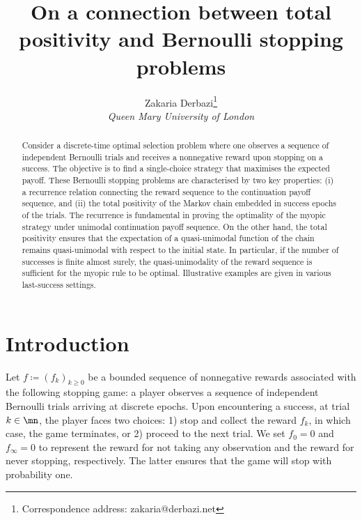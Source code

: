 \documentclass[11pt]{article}
\title{On a connection between total positivity and Bernoulli stopping problems}
\author{Zakaria Derbazi\footnote{Correspondence address: zakaria@derbazi.net} \\{\it\small Queen Mary University of London}}
\def\myabstract{
	Consider a discrete-time optimal selection problem where one observes a sequence of   independent Bernoulli trials and receives a nonnegative reward upon stopping on a success. The objective is to find a single-choice strategy that maximises the expected payoff. These Bernoulli stopping problems are characterised by two key properties: (i) a recurrence relation connecting the reward sequence to the continuation payoff sequence, and (ii) the total positivity of the Markov chain  embedded in success epochs of the trials. The recurrence is fundamental in proving the optimality of the myopic strategy under unimodal continuation payoff sequence. On the other hand, the total positivity ensures that the expectation of a quasi-unimodal function of the chain remains quasi-unimodal with respect to the initial state. In particular, if  the number of successes is finite almost surely, the quasi-unimodality of the  reward sequence is sufficient for the myopic rule to be optimal. Illustrative examples are given in various last-success settings.
}
\begin{document}
	\maketitle
	\begin{abstract}
		\myabstract
	\end{abstract}
	
	

	\section{Introduction}\label{sect1}
	Let  $f \coloneqq (f_k)_{k \ge 0}$ be a bounded sequence of nonnegative rewards associated with the following stopping game:    a player observes a sequence of independent Bernoulli trials arriving at discrete epochs. Upon encountering a success, at trial $k \in \mn$,  the player faces two choices: 
	1) stop and collect the reward $f_k$, in which case, the game terminates, or 2) proceed to the next trial. We set $f_0 = 0$ and $f_\infty= 0$ to represent the reward for not taking any observation and the reward for never stopping,  respectively. The latter ensures that the game will stop with probability one. 
	
\end{document}
